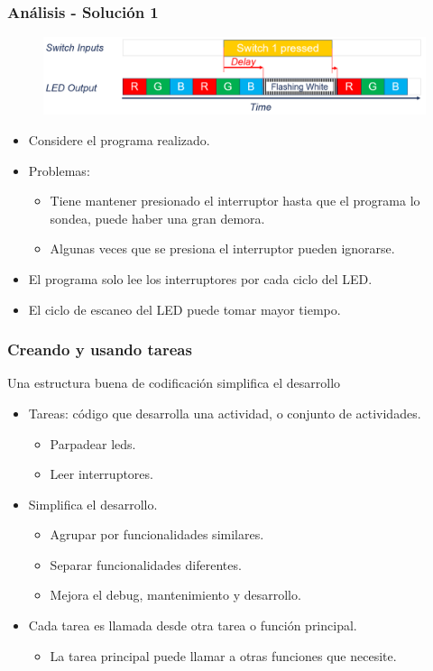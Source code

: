 \documentclass[10.5pt,scale=1.0,t,aspectratio=169,hyperref={pdfpagelabels=false}]{beamer}
\begin{document}
\begin{frame}
	\frametitle{Análisis - Solución 1}
	\begin{figure}
		\centering
		\includegraphics[scale=0.45]{04_TimingSolution1}
	\end{figure}
\begin{itemize}
	\item Considere el programa realizado.
	\item Problemas:
	\begin{itemize}
		\item Tiene mantener presionado el interruptor hasta que el programa lo sondea, puede haber una gran demora.
		\item Algunas veces que se presiona el interruptor pueden ignorarse.
	\end{itemize}
	\item El programa solo lee los interruptores por cada ciclo del LED.
	\item El ciclo de escaneo del LED puede tomar mayor tiempo.
\end{itemize}
\end{frame}
\begin{frame}
	\frametitle{Creando y usando tareas}
	Una estructura buena de codificación simplifica el desarrollo
	\begin{itemize}
		\item Tareas: código que desarrolla una actividad, o conjunto de actividades.
		\begin{itemize}
			\item Parpadear leds.
			\item Leer interruptores.
		\end{itemize}
		\item Simplifica el desarrollo.
		\begin{itemize}
			\item Agrupar por funcionalidades similares.
			\item Separar funcionalidades diferentes.
			\item Mejora el debug, mantenimiento y desarrollo. 
		\end{itemize}
		\item Cada tarea es llamada desde otra tarea o función principal.
		\begin{itemize}
			\item La tarea principal puede llamar a otras funciones que necesite. 
		\end{itemize}
	\end{itemize}
\end{frame}
\end{document}
